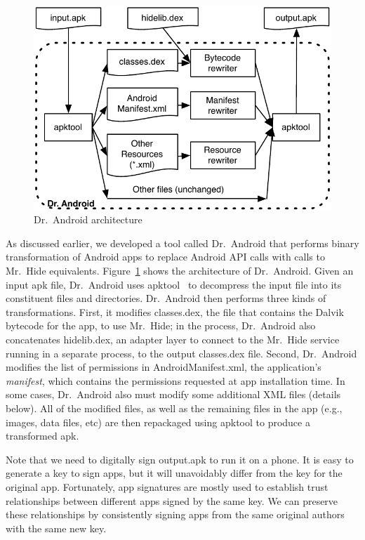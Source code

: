 \documentclass[preprint]{sig-alternate-10pt}
\newcommand{\code}[1]{\textsf{#1}}
\newcommand{\lib}{Mr.\ Hide\xspace}
\newcommand{\rewriter}{Dr.\ Android\xspace}
\begin{document}
\begin{figure}[t]
  \centering \includegraphics[width=\columnwidth]{arch}
  \caption{\rewriter architecture}
  \label{fig:arch}
\end{figure}

As discussed earlier, we developed a tool called \rewriter
that performs binary transformation of Android apps to replace Android API
calls with calls to \lib equivalents. Figure~\ref{fig:arch} shows the
architecture of \rewriter. Given an input apk file, \rewriter
uses \code{apktool}~\cite{apktool} to decompress the input
file into its constituent files and directories. \rewriter then
performs three kinds of transformations. First, it modifies
\code{classes.dex}, the file that contains the Dalvik bytecode for
the app, to use \lib; in the process, \rewriter also concatenates \code{hidelib.dex},
an adapter layer to connect to the \lib service running in a separate
process, to the output \code{classes.dex} file. Second, \rewriter
modifies the list of permissions in \code{AndroidManifest.xml}, the
application's \emph{manifest}, which
contains the permissions requested at app installation time. In some
cases, \rewriter also must modify some additional XML files
(details below). All of the modified files, as well as the remaining
files in the app (e.g., images, data files, etc) are then repackaged
using \code{apktool} to produce a transformed apk.

Note that we need to digitally sign \code{output.apk} to run it on a
phone. It is easy to generate a key to sign apps, but it will
unavoidably differ from the key for the original app. Fortunately,
app signatures are mostly used to establish trust relationships
between different apps signed by the same key. We can
preserve these relationships by consistently signing apps from the
same original authors with the same new key.
\end{document}
